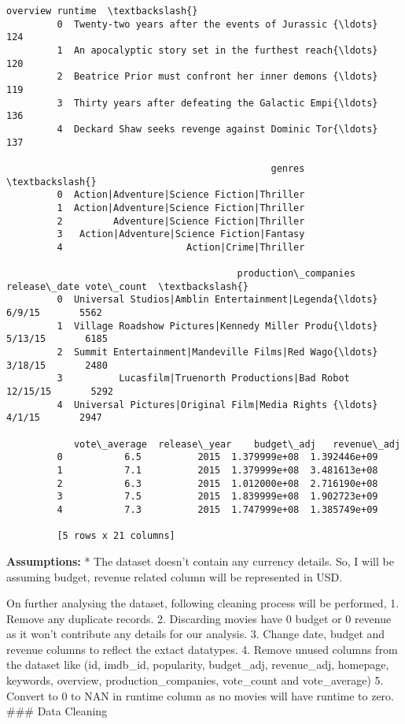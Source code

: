 \documentclass[11pt]{article}
\begin{document}
\begin{Verbatim}[commandchars=\\\{\}]
                                                     overview runtime  \textbackslash{}
         0  Twenty-two years after the events of Jurassic {\ldots}     124   
         1  An apocalyptic story set in the furthest reach{\ldots}     120   
         2  Beatrice Prior must confront her inner demons {\ldots}     119   
         3  Thirty years after defeating the Galactic Empi{\ldots}     136   
         4  Deckard Shaw seeks revenge against Dominic Tor{\ldots}     137   
         
                                               genres  \textbackslash{}
         0  Action|Adventure|Science Fiction|Thriller   
         1  Action|Adventure|Science Fiction|Thriller   
         2         Adventure|Science Fiction|Thriller   
         3   Action|Adventure|Science Fiction|Fantasy   
         4                      Action|Crime|Thriller   
         
                                         production\_companies release\_date vote\_count  \textbackslash{}
         0  Universal Studios|Amblin Entertainment|Legenda{\ldots}       6/9/15       5562   
         1  Village Roadshow Pictures|Kennedy Miller Produ{\ldots}      5/13/15       6185   
         2  Summit Entertainment|Mandeville Films|Red Wago{\ldots}      3/18/15       2480   
         3          Lucasfilm|Truenorth Productions|Bad Robot     12/15/15       5292   
         4  Universal Pictures|Original Film|Media Rights {\ldots}       4/1/15       2947   
         
            vote\_average  release\_year    budget\_adj   revenue\_adj  
         0           6.5          2015  1.379999e+08  1.392446e+09  
         1           7.1          2015  1.379999e+08  3.481613e+08  
         2           6.3          2015  1.012000e+08  2.716190e+08  
         3           7.5          2015  1.839999e+08  1.902723e+09  
         4           7.3          2015  1.747999e+08  1.385749e+09  
         
         [5 rows x 21 columns]
\end{Verbatim}
            
    \textbf{Assumptions:} * The dataset doesn't contain any currency
details. So, I will be assuming budget, revenue related column will be
represented in USD.

On further analysing the dataset, following cleaning process will be
performed, 1. Remove any duplicate records. 2. Discarding movies have 0
budget or 0 revenue as it won't contribute any details for our analysis.
3. Change date, budget and revenue columns to reflect the extact
datatypes. 4. Remove unused columns from the dataset like (id, imdb\_id,
popularity, budget\_adj, revenue\_adj, homepage, keywords, overview,
production\_companies, vote\_count and vote\_average) 5. Convert to 0 to
NAN in runtime column as no movies will have runtime to zero. \#\#\#
Data Cleaning
\end{document}
